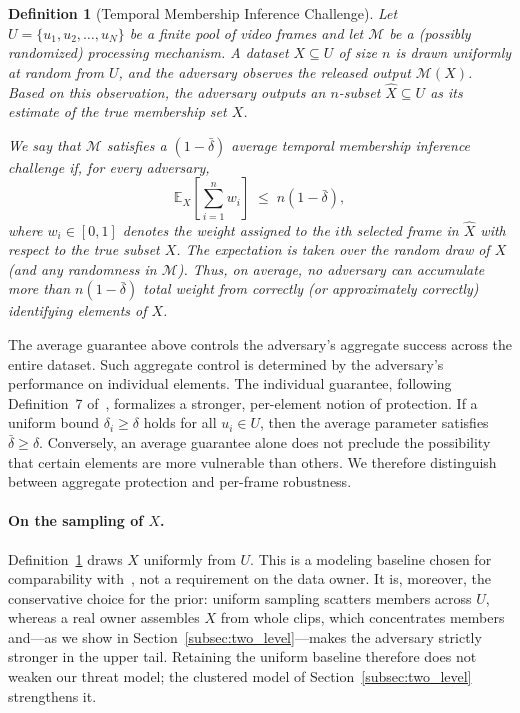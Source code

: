 \documentclass[sigconf,anonymous, review]{acmart}
\newtheorem{definition}[theorem]{Definition}
\begin{document}
\begin{definition}[Temporal Membership Inference Challenge]\label{memebership inference challenge}
Let $U = \{u_1, u_2, \dots, u_N\}$ be a finite pool of video frames and let $\mathcal{M}$ be a (possibly randomized) processing mechanism. A dataset $X \subseteq U$ of size $n$ is drawn uniformly at random from $U$, and the adversary observes the released output $\mathcal{M}(X)$. Based on this observation, the adversary outputs an $n$-subset $\hat{X} \subseteq U$ as its estimate of the true membership set $X$.

We say that $\mathcal{M}$ satisfies a $(1-\bar{\delta})$ average temporal membership inference challenge if, for every adversary,
\begin{equation}\label{eq:inference}
    \mathbb{E}_{X}\!\left[\sum_{i=1}^n w_i \right]
    \;\le\; n(1-\bar{\delta}),
\end{equation}
where $w_i \in [0,1]$ denotes the weight assigned to the $i$th selected frame in $\hat{X}$ with respect to the true subset $X$. The expectation is taken over the random draw of $X$ (and any randomness in $\mathcal{M}$). Thus, on average, no adversary can accumulate more than $n(1-\bar{\delta})$ total weight from correctly (or approximately correctly) identifying elements of $X$.
\end{definition}

The average guarantee above controls the adversary's aggregate success across the entire dataset. Such aggregate control is determined by the adversary's performance on individual elements. The individual guarantee, following Definition~7 of~\cite{xiao2024formal}, formalizes a stronger, per-element notion of protection. If a uniform bound $\delta_i \ge \delta$ holds for all $u_i \in U$, then the average parameter satisfies $\bar{\delta} \ge \delta$. Conversely, an average guarantee alone does not preclude the possibility that certain elements are more vulnerable than others. We therefore distinguish between aggregate protection and per-frame robustness.

\paragraph{On the sampling of $X$.}
Definition~\ref{memebership inference challenge} draws $X$ uniformly from $U$. This is a modeling baseline chosen for comparability with~\cite{xiao2024formal}, not a requirement on the data owner. It is, moreover, the conservative choice for the prior: uniform sampling scatters members across $U$, whereas a real owner assembles $X$ from whole clips, which concentrates members and---as we show in Section~\ref{subsec:two_level}---makes the adversary strictly stronger in the upper tail. Retaining the uniform baseline therefore does not weaken our threat model; the clustered model of Section~\ref{subsec:two_level} strengthens it.
\end{document}
